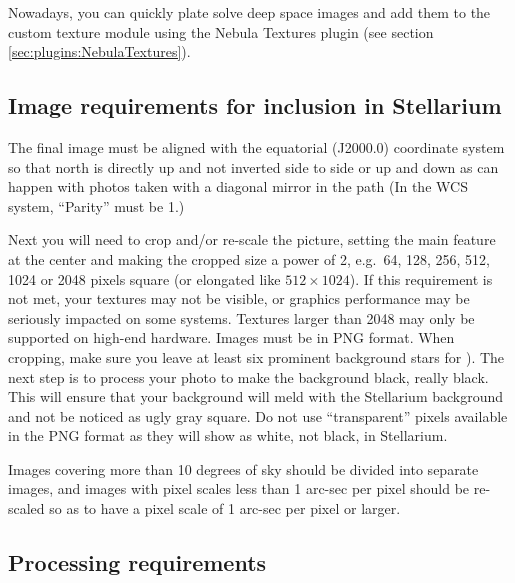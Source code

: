 Nowadays, you can quickly plate solve deep space images and add them to the custom texture 
module using the Nebula Textures plugin (see section \ref{sec:plugins:NebulaTextures}).

\subsection{Image requirements for inclusion in Stellarium}
\label{sec:dso:adding_images:image-requirements}

The final image must be aligned with the equatorial (J2000.0)
coordinate system so that north is directly up and not inverted side
to side or up and down as can happen with photos taken with a diagonal
mirror in the path (In the WCS system, ``Parity'' must be 1.)

Next you will need to crop and/or re-scale the picture, setting the
main feature at the center and making the cropped size a power of 2,
e.g.\ 64, 128, 256, 512, 1024 or 2048 pixels square (or elongated like
$512\times1024$). If this requirement is not met, your textures may
not be visible, or graphics performance may be seriously impacted on
some systems. Textures larger than 2048 may only be supported on
high-end hardware. Images must be in PNG format. When cropping, make
sure you leave at least six prominent background stars for
). The next step is to process your photo to
make the background black, really black. This will ensure that your
background will meld with the Stellarium background and not be noticed
as ugly gray square. Do not use ``transparent'' pixels available in
the PNG format as they will show as white, not black, in Stellarium.

Images covering more than 10 degrees of sky should be divided into
separate images, and images with pixel scales less than 1 arc-sec per
pixel should be re-scaled so as to have a pixel scale of 1 arc-sec per
pixel or larger.

\subsection{Processing requirements}
\label{sec:dso:adding_images:processing-requirements}

